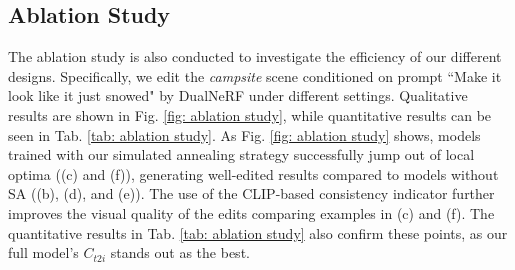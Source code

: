 \subsection{Ablation Study}
The ablation study is also conducted to investigate the efficiency of our different designs. Specifically, we edit the \textit{campsite} scene conditioned on prompt ``Make it look like it just snowed" by DualNeRF under different settings. Qualitative results are shown in Fig. \ref{fig: ablation study}, while quantitative results can be seen in Tab. \ref{tab: ablation study}. As Fig. \ref{fig: ablation study} shows, models trained with our simulated annealing strategy successfully jump out of local optima ((c) and (f)), generating well-edited results compared to models without SA ((b), (d), and (e)). The use of the CLIP-based consistency indicator further improves the visual quality of the edits comparing examples in (c) and (f). The quantitative results in Tab. \ref{tab: ablation study} also confirm these points, as our full model's $C_{t2i}$ stands out as the best.
